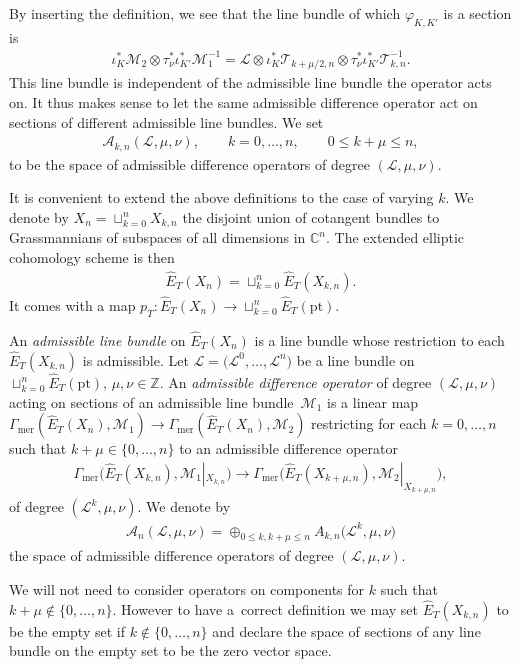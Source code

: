 \documentclass[pdftex]{sigma}
\numberwithin{equation}{section}
\begin{document}
By inserting the definition, we see that the line bundle of which $\varphi_{K,K'}$ is a section is
\begin{gather*}
 \iota_K^*\mathcal M_2\otimes \tau_\nu^*\iota_{K'}^*\mathcal M_1^{-1}= \mathcal L\otimes \iota^*_{K}\mathcal T_{k+\mu/2,n}\otimes \tau_\nu^*\iota_{K'}^*\mathcal T_{k,n}^{-1}.
\end{gather*}
This line bundle is independent of the admissible line bundle the operator acts on. It thus makes sense to let the same admissible difference operator act on sections of different admissible line bundles. We set
\begin{gather*}
 \mathcal A_{k,n}(\mathcal L,\mu,\nu), \qquad k=0,\dots,n,\qquad 0\leq k+\mu\leq n,
\end{gather*}
to be the space of admissible difference operators of degree $(\mathcal L,\mu,\nu)$.

It is convenient to extend the above definitions to the case of varying $k$. We denote by $X_n=\sqcup_{k=0}^n X_{k,n}$ the disjoint union of cotangent bundles to Grassmannians of subspaces of all dimensions in $\mathbb C^n$. The extended elliptic cohomology scheme
is then
\begin{gather*}
 \hat E_T(X_n)=\sqcup_{k=0}^n \hat E_T(X_{k,n}).
\end{gather*}
It comes with a map $p_T\colon \hat E_T(X_n)\to \sqcup_{k=0}^n\hat E_T(\mathrm{pt})$.

\begin{Definition} An {\em admissible line bundle} on $\hat E_T(X_n)$ is a line bundle whose restriction to each $\hat E_T(X_{k,n})$ is admissible. Let $\mathcal L=\big(\mathcal L^0,\dots,\mathcal L^n\big)$ be a line bundle on $\sqcup_{k=0}^n\hat E_T(\mathrm{pt})$, $\mu,\nu\in\mathbb Z$. An {\em admissible difference operator} of degree $(\mathcal L,\mu,\nu)$ acting on sections of an admissible line bundle~$\mathcal M_1$ is a linear map $\Gamma_{\mathrm{mer}}(\hat E_T(X_n),\mathcal M_1)\to \Gamma_{\mathrm{mer}}(\hat E_T(X_n),\mathcal M_2)$ restricting for each $k=0,\dots,n$ such that $k+\mu\in\{0,\dots,n\}$ to an admissible difference operator
 \begin{gather*}
 \Gamma_{\mathrm{mer}}\big(\hat E_T(X_{k,n}),\mathcal M_1|_{X_{k,n}}\big)\to\Gamma_{\mathrm{mer}}\big(\hat E_T(X_{k+\mu,n}),\mathcal M_2|_{X_{k+\mu,n}}\big),
 \end{gather*}
 of degree $(\mathcal L^k,\mu,\nu)$. We denote by
 \begin{gather*}
 \mathcal A_n(\mathcal L,\mu,\nu)=\oplus_{0\leq k,k+\mu\leq n} A_{k,n}\big(\mathcal L^k,\mu,\nu\big)
 \end{gather*}
 the space of admissible difference operators of degree $(\mathcal L,\mu,\nu)$.
\end{Definition}
\begin{Remark} We will not need to consider operators on components for $k$ such that $k+\mu\not\in \{0,\dots,n\}$. However to have a~correct definition we may set $\hat E_T(X_{k,n})$ to be the empty set if $k\not\in\{0,\dots,n\}$ and declare the space of sections of any line bundle on the empty set to be the zero vector space.
\end{Remark}
\end{document}
